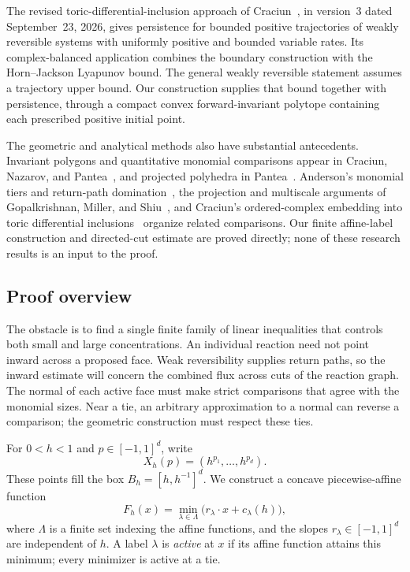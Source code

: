 The revised toric-differential-inclusion approach of
Craciun~\cite[Section~8, final remark, p.~81]{Craciun2026}, in version~3
dated September~23, 2026, gives persistence for bounded positive
trajectories of weakly reversible systems with uniformly positive and
bounded variable rates. Its complex-balanced application combines the
boundary construction with the Horn--Jackson Lyapunov bound. The general
weakly reversible statement assumes a trajectory upper bound.
Our construction supplies that bound together with persistence, through
a compact convex forward-invariant polytope containing each prescribed
positive initial point.

The geometric and analytical methods also have substantial antecedents.
Invariant polygons and quantitative monomial comparisons appear in
Craciun, Nazarov, and Pantea~\cite{CraciunNazarovPantea2013}, and
projected polyhedra in Pantea~\cite{Pantea2012}. Anderson's monomial
tiers and return-path domination~\cite{Anderson2011Global}, the
projection and multiscale arguments of Gopalkrishnan, Miller, and
Shiu~\cite{GopalkrishnanMillerShiu2013,GopalkrishnanMillerShiu2014},
and Craciun's ordered-complex embedding into toric differential
inclusions~\cite{Craciun2019} organize related comparisons. Our
finite affine-label construction and directed-cut estimate are proved
directly; none of these research results is an input to the proof.

\subsection{Proof overview}

The obstacle is to find a single finite family of linear inequalities
that controls both small and large concentrations. An individual reaction
need not point inward across a proposed face. Weak reversibility supplies
return paths, so the inward estimate will concern the combined flux across
cuts of the reaction graph. The normal of each active face must make
strict comparisons that agree with the monomial sizes. Near a tie, an
arbitrary approximation to a normal can reverse a comparison; the geometric
construction must respect these ties.

For $0<h<1$ and $p\in[-1,1]^d$, write
\[
 X_h(p)=(h^{p_1},\ldots,h^{p_d}).
\]
These points fill the box $B_h=[h,h^{-1}]^d$. We construct a concave
piecewise-affine function
\[
 F_h(x)=\min_{\lambda\in\Lambda}
       \bigl(r_\lambda\cdot x+c_\lambda(h)\bigr),
\]
where $\Lambda$ is a finite set indexing the affine functions, and the
slopes $r_\lambda\in[-1,1]^d$ are independent of $h$. A label
$\lambda$ is \emph{active} at $x$ if its affine function attains this
minimum; every minimizer is active at a tie.

